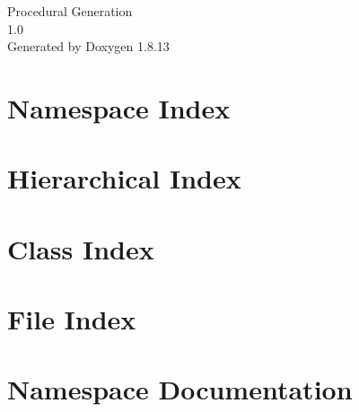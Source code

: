 \documentclass[twoside]{book}
\newcommand{\+}{\discretionary{\mbox{\scriptsize$\hookleftarrow$}}{}{}}
\newcommand{\clearemptydoublepage}{%
  \newpage{\pagestyle{empty}\cleardoublepage}%
}
\begin{document}
\begin{titlepage}
\vspace*{7cm}
\begin{center}%
{\Large Procedural Generation \\[1ex]\large 1.\+0 }\\
\vspace*{1cm}
{\large Generated by Doxygen 1.8.13}\\
\end{center}
\end{titlepage}
\clearemptydoublepage
{}
\tableofcontents
\clearemptydoublepage
{}

\chapter{Namespace Index}

\chapter{Hierarchical Index}

\chapter{Class Index}

\chapter{File Index}

\chapter{Namespace Documentation}


\end{document}
